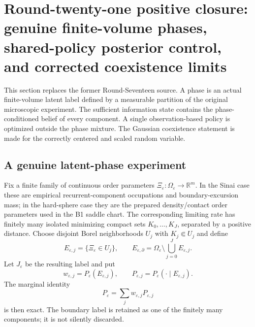 \section{Round-twenty-one positive closure: genuine finite-volume phases, shared-policy posterior control, and corrected coexistence limits}
\label{sec:r21-d1}

This section replaces the former Round-Seventeen source.  A phase is an actual
finite-volume latent label defined by a measurable partition of the original
microscopic experiment.  The sufficient information state contains the
phase-conditioned belief of every component.  A single observation-based
policy is optimized outside the phase mixture.  The Gaussian coexistence
statement is made for the correctly centered and scaled random variable.

\subsection{A genuine latent-phase experiment}

Fix a finite family of continuous order parameters
$\Xi_\varepsilon:\Omega_\varepsilon\to\mathbb R^m$.  In the Sinai case these
are empirical recurrent-component occupations and boundary-excursion mass; in
the hard-sphere case they are the prepared density/contact order parameters
used in the B1 saddle chart.  The corresponding limiting rate has finitely
many isolated minimizing compact sets $K_0,\ldots,K_J$, separated by a
positive distance.  Choose disjoint Borel neighborhoods $U_j$ with
$K_j\Subset U_j$ and define
\[
 E_{\varepsilon,j}=\{\Xi_\varepsilon\in U_j\},
 \qquad
 E_{\varepsilon,\partial}=\Omega_\varepsilon\setminus
 \bigcup_{j=0}^J E_{\varepsilon,j}.
\]
Let $J_\varepsilon$ be the resulting label and put
\[
 w_{\varepsilon,j}=P_\varepsilon(E_{\varepsilon,j}),
 \qquad
 P_{\varepsilon,j}=P_\varepsilon(\cdot\mid E_{\varepsilon,j}).
\]
The marginal identity
\[
 P_\varepsilon=\sum_jw_{\varepsilon,j}P_{\varepsilon,j}
\]
is then exact.  The boundary label is retained as one of the finitely many
components; it is not silently discarded.

